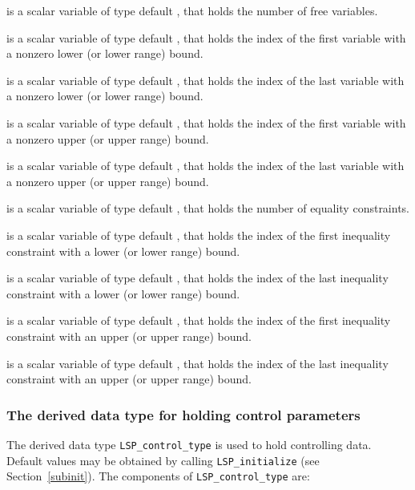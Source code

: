 \documentclass{galahad}
\newcommand{\packagename}{LSP}
\begin{document}
\begin{description}
 is a scalar variable of type default \integer, that holds the 
number of free variables. 
    
 is a scalar variable of type default \integer, that holds the 
index of the first variable with a nonzero lower (or lower range) bound. 
    
 is a scalar variable of type default \integer, that holds the 
index of the last variable with a nonzero lower (or lower range) bound. 
    
 is a scalar variable of type default \integer, that holds the 
index of the first variable with a nonzero upper (or upper range) bound. 
    
 is a scalar variable of type default \integer, that holds the 
index of the last variable with a nonzero upper (or upper range) bound. 
    
 is a scalar variable of type default \integer, that holds the 
number of equality constraints. 
    
 is a scalar variable of type default \integer, that holds the 
index of the first inequality constraint with a lower (or lower range) bound. 
    
 is a scalar variable of type default \integer, that holds the 
index of the last inequality constraint with a lower (or lower range) bound. 
    
 is a scalar variable of type default \integer, that holds the 
index of the first inequality constraint with an upper (or upper range) bound. 
    
 is a scalar variable of type default \integer, that holds the 
index of the last inequality constraint with an upper (or upper range) bound. 
 
\end{description}


\subsubsection{The derived data type for holding control 
 parameters}\label{typecontrol}
The derived data type 
{\tt \packagename\_control\_type} 
is used to hold controlling data. Default values may be obtained by calling 
{\tt \packagename\_initialize}
(see Section~\ref{subinit}). The components of 
{\tt \packagename\_control\_type} 
are:
\end{document}
